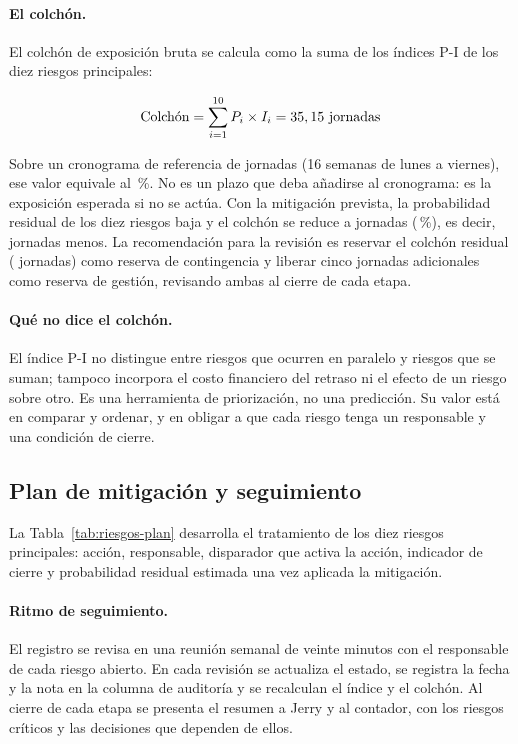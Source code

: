 \paragraph{El colchón.} El colchón de exposición bruta se calcula como la
suma de los índices P-I de los diez riesgos principales:

\[
\mbox{Colchón} = \sum_{i=1}^{10} P_i \times I_i = 35,15\ \mbox{jornadas}
\]

Sobre un cronograma de referencia de \JornadasProyecto{} jornadas (16
semanas de lunes a viernes), ese valor equivale al \ColchonPorcentaje\,\%.
No es un plazo que deba añadirse al cronograma: es la exposición esperada
si no se actúa. Con la mitigación prevista, la probabilidad residual de los
diez riesgos baja y el colchón se reduce a \ColchonResidual{} jornadas
(\ColchonResidualPorcentaje\,\%), es decir, \ColchonAhorro{} jornadas menos.
La recomendación para la revisión es reservar el colchón residual
(\ColchonResidual{} jornadas) como reserva de contingencia y liberar cinco
jornadas adicionales como reserva de gestión, revisando ambas al cierre de
cada etapa.

\paragraph{Qué no dice el colchón.} El índice P-I no distingue entre riesgos
que ocurren en paralelo y riesgos que se suman; tampoco incorpora el costo
financiero del retraso ni el efecto de un riesgo sobre otro. Es una
herramienta de priorización, no una predicción. Su valor está en comparar y
ordenar, y en obligar a que cada riesgo tenga un responsable y una condición
de cierre.

\subsection{Plan de mitigación y seguimiento}
\label{subsec:riesgos-plan}

La Tabla~\ref{tab:riesgos-plan} desarrolla el tratamiento de los diez
riesgos principales: acción, responsable, disparador que activa la acción,
indicador de cierre y probabilidad residual estimada una vez aplicada la
mitigación.



\paragraph{Ritmo de seguimiento.} El registro se revisa en una reunión
semanal de veinte minutos con el responsable de cada riesgo abierto. En cada
revisión se actualiza el estado, se registra la fecha y la nota en la
columna de auditoría y se recalculan el índice y el colchón. Al cierre de
cada etapa se presenta el resumen a Jerry y al contador, con los riesgos
críticos y las decisiones que dependen de ellos.


